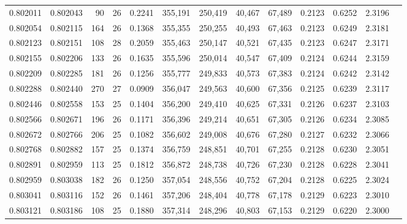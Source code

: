 \begin{tabular}{rrrrrrrrrrrrr}
0.802011 & 0.802043 &    90 &  26 &                                     0.2241 & 355,191 & 250,419 &  40,467 &  67,489 & 0.2123 & 0.6252 & 2.3196 \\
0.802054 & 0.802115 &   164 &  26 &                                     0.1368 & 355,355 & 250,255 &  40,493 &  67,463 & 0.2123 & 0.6249 & 2.3181 \\
0.802123 & 0.802151 &   108 &  28 &                                     0.2059 & 355,463 & 250,147 &  40,521 &  67,435 & 0.2123 & 0.6247 & 2.3171 \\
0.802155 & 0.802206 &   133 &  26 &                                     0.1635 & 355,596 & 250,014 &  40,547 &  67,409 & 0.2124 & 0.6244 & 2.3159 \\
0.802209 & 0.802285 &   181 &  26 &                                     0.1256 & 355,777 & 249,833 &  40,573 &  67,383 & 0.2124 & 0.6242 & 2.3142 \\
0.802288 & 0.802440 &   270 &  27 &                                     0.0909 & 356,047 & 249,563 &  40,600 &  67,356 & 0.2125 & 0.6239 & 2.3117 \\
0.802446 & 0.802558 &   153 &  25 &                                     0.1404 & 356,200 & 249,410 &  40,625 &  67,331 & 0.2126 & 0.6237 & 2.3103 \\
0.802566 & 0.802671 &   196 &  26 &                                     0.1171 & 356,396 & 249,214 &  40,651 &  67,305 & 0.2126 & 0.6234 & 2.3085 \\
0.802672 & 0.802766 &   206 &  25 &                                     0.1082 & 356,602 & 249,008 &  40,676 &  67,280 & 0.2127 & 0.6232 & 2.3066 \\
0.802768 & 0.802882 &   157 &  25 &                                     0.1374 & 356,759 & 248,851 &  40,701 &  67,255 & 0.2128 & 0.6230 & 2.3051 \\
0.802891 & 0.802959 &   113 &  25 &                                     0.1812 & 356,872 & 248,738 &  40,726 &  67,230 & 0.2128 & 0.6228 & 2.3041 \\
0.802959 & 0.803038 &   182 &  26 &                                     0.1250 & 357,054 & 248,556 &  40,752 &  67,204 & 0.2128 & 0.6225 & 2.3024 \\
0.803041 & 0.803116 &   152 &  26 &                                     0.1461 & 357,206 & 248,404 &  40,778 &  67,178 & 0.2129 & 0.6223 & 2.3010 \\
0.803121 & 0.803186 &   108 &  25 &                                     0.1880 & 357,314 & 248,296 &  40,803 &  67,153 & 0.2129 & 0.6220 & 2.3000 \\

\end{tabular}
